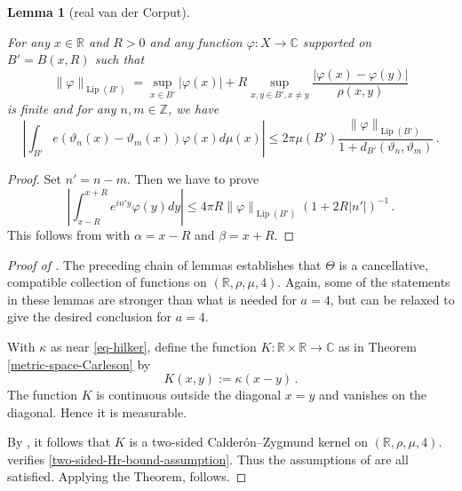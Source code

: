 \documentclass[10pt,a4paper]{article}
\theoremstyle{plain}
\newtheorem{lemma}[theorem]{Lemma}
\theoremstyle{definition}
\numberwithin{equation}{subsection}
\newcommand{\R}{{\mathbb{R}}}
\DeclareMathOperator{\Lip}{\operatorname{Lip}}
\newcommand{\mfa}{{\vartheta}}
\newcommand{\Mf}{{\Theta}}
\newcommand{\lean}[1]{}
\newcommand{\proves}[1]{}
\newcommand{\uses}[1]{}
\newcommand{\leanok}{}
\def\C{\mathbb{C}}
\begin{document}
\begin{lemma}[real van der Corput]
\label{real-van-der-Corput}
\leanok
\lean{real_van_der_Corput}
\uses{van-der-Corput}
    For any $x\in \R$ and $R>0$ and any
    function $\varphi: X\to \C$ supported on $B'=B(x,R)$
    such that
\begin{equation}
    \|\varphi\|_{\Lip(B')} = \sup_{x \in B'} |\varphi(x)| + R \sup_{x,y \in B', x \neq y} \frac{|\varphi(x) - \varphi(y)|}{\rho(x,y)}
\end{equation}
is finite and for any $n,m\in \mathbb{Z}$, we have
\begin{equation}
    \label{eq-vdc-cond1}
    \left|\int_{B'} e(\mfa_n(x)-{\mfa_m(x)}) \varphi(x) d\mu(x)\right|\le 2\pi \mu(B')\frac{\|\varphi\|_{\Lip(B')}}{1+d_{B'}(\mfa_n,\mfa_m)}
\, .
\end{equation}
\end{lemma}
\begin{proof}
    \leanok
Set $n'=n-m$. Then we have to prove
\begin{equation}
    \label{eq-vdc-cond2}
    \left|\int_{x-R}^{x+R} e^{in'y}\varphi(y) dy\right|\le 4\pi R\|\varphi\|_{\Lip(B')}
(1+2R|n'|)^{-1}\, .
\end{equation}
This follows from  with $\alpha = x - R$ and $\beta = x + R$.
\end{proof}

\begin{proof}[Proof of ]
\proves{real-Carleson}
\leanok

The preceding chain of lemmas establishes that $\Mf$ is a cancellative, compatible collection of functions on $(\R, \rho, \mu, 4)$. Again, some of the statements in these lemmas are stronger than what is needed for $a=4$, but can be relaxed to give the desired conclusion for $a=4$.

With $\kappa$ as near \eqref{eq-hilker}, define
the function $K:\R\times \R\to \mathbb{C}$ as in Theorem
\ref{metric-space-Carleson} by
\begin{equation}
    K(x,y):=\kappa(x-y)\, .
\end{equation}
The function $K$ is continuous outside the diagonal
$x=y$ and vanishes on the diagonal. Hence it is measurable.


By , it follows that $K$ is a two-sided Calder\'on--Zygmund kernel on $(\R,\rho,\mu,4)$.
 verifies \eqref{two-sided-Hr-bound-assumption}.
Thus the assumptions of  are all satisfied. Applying the Theorem,  follows.

\end{proof}
\end{document}
